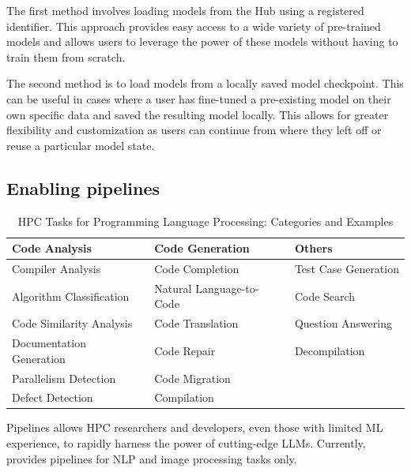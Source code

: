 The first method involves loading models from the \face Hub using a registered identifier. This approach provides easy access to a wide variety of pre-trained models and allows users to leverage the power of these models without having to train them from scratch.

The second method is to load models from a locally saved model checkpoint. This can be useful in cases where a user has fine-tuned a pre-existing model on their own specific data and saved the resulting model locally. This allows for greater flexibility and customization as users can continue from where they left off or reuse a particular model state.



\subsection{Enabling pipelines}
\begin{table}[htbp]
\centering
\caption{HPC Tasks for Programming Language Processing: Categories and Examples}
\label{tab-HPC-tasks}
\begin{tabular}{l|l|l}
\hline
\textbf{Code Analysis} & \textbf{Code Generation} & \textbf{Others} \\ \hline
Compiler Analysis & Code Completion & Test Case Generation \\
Algorithm Classification & Natural Language-to-Code & Code Search \\
Code Similarity Analysis & Code Translation & Question Answering \\
Documentation Generation & Code Repair & Decompilation \\
Parallelism Detection & Code Migration &  \\
Defect Detection & Compilation &  \\ \hline
\end{tabular}
\end{table}

Pipelines allows HPC researchers and developers, even those with limited ML experience, to rapidly harness the power of cutting-edge LLMs. Currently, \face provides pipelines for NLP and image processing tasks only. 
